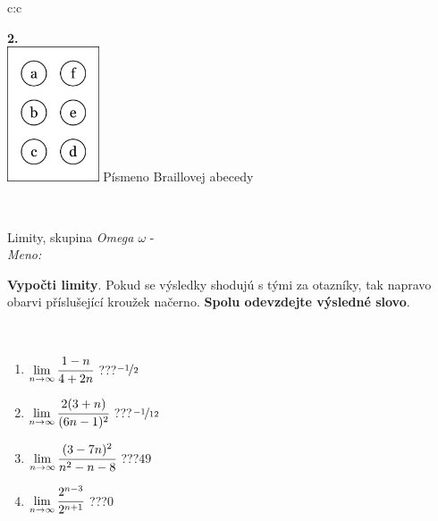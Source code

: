 \documentclass[10pt]{report}
\begin{document}
\begin{tabular}{c:c}
\begin{minipage}[c][104.5mm][t]{0.5\linewidth}
\begin{center}
\begin{minipage}{0.20\linewidth}
\begin{center}
{\Huge\bfseries 2.} \\[2mm]
\includegraphics[height=40mm]{../images/braille.png}
{\small Písmeno Braillovej abecedy}
\end{center}
\end{minipage}
\end{center}
\end{minipage}
\\ \hdashline
\begin{minipage}[c][104.5mm][t]{0.5\linewidth}
\begin{center}
\vspace{7mm}
{\huge Limity, skupina \textit{Omega $\omega$} -}\\[5mm]
\textit{Meno:}\phantom{xxxxxxxxxxxxxxxxxxxxxxxxxxxxxxxxxxxxxxxxxxxxxxxxxxxxxxxxxxxxxxxxx}\\[5mm]
\begin{minipage}{0.95\linewidth}
\begin{center}
\textbf{Vypočti limity}. Pokud se výsledky shodujú s tými za otazníky, tak napravo\\obarvi příslušející kroužek načerno. \textbf{Spolu odevzdejte výsledné slovo}.
\end{center}
\end{minipage}
\\[1mm]
\begin{minipage}{0.79\linewidth}
\begin{center}
\begin{varwidth}{\linewidth}
\begin{enumerate}
\normalsize
\item $\lim\limits_{n\to\infty}\cfrac{1-n}{4+2n}$\quad \dotfill\; ???\;\dotfill \quad $\nicefrac{-1}{2}$
\item $\lim\limits_{n\to\infty}\cfrac{2(3+n)}{(6n-1)^2}$\quad \dotfill\; ???\;\dotfill \quad $\nicefrac{-1}{12}$
\item $\lim\limits_{n\to\infty}\cfrac{(3-7n)^2}{n^2-n-8}$\quad \dotfill\; ???\;\dotfill \quad $49$
\item $\lim\limits_{n\to\infty}\cfrac{2^{n-3}}{2^{n+1}}$\quad \dotfill\; ???\;\dotfill \quad $0$

\end{enumerate}
\end{varwidth}
\end{center}
\end{minipage}
\end{center}
\end{minipage}
\end{tabular}
\end{document}

